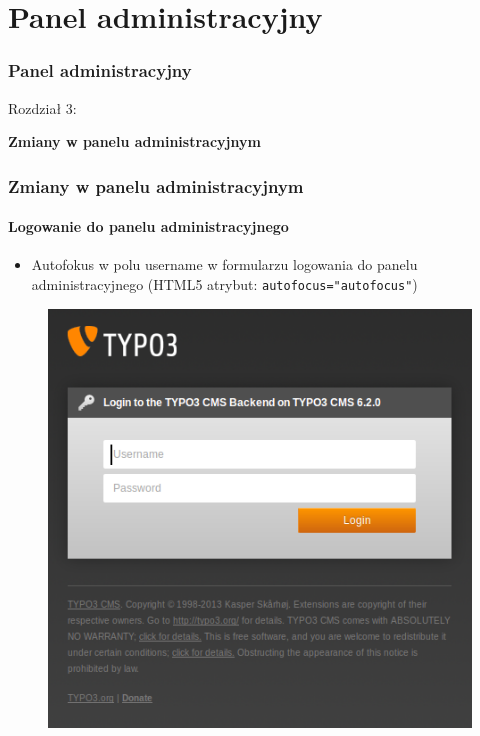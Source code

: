 %
\section{Panel administracyjny}
\begin{frame}[fragile] 
	\frametitle{Panel administracyjny}

	\begin{center}\huge{Rozdział 3:}\end{center}
	\begin{center}\huge{\color{typo3darkgrey}\textbf{Zmiany w panelu administracyjnym}}\end{center}

\end{frame}


\begin{frame}[fragile]
	\frametitle{Zmiany w panelu administracyjnym}
	\framesubtitle{Logowanie do panelu administracyjnego}

 	\begin{itemize}
		\item Autofokus w polu username w formularzu logowania do panelu administracyjnego\newline
			(HTML5 atrybut: \texttt{autofocus="autofocus"})
	\end{itemize}

	\begin{figure}
		\includegraphics[width=0.4\linewidth]{Images/BackendChanges/BackendLogin.png}
	\end{figure}

\end{frame}

